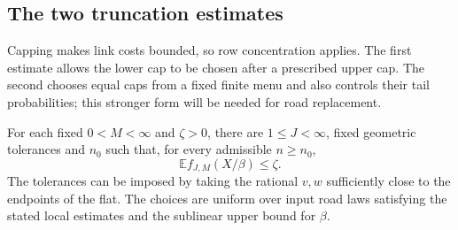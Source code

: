 \subsection{The two truncation estimates}

Capping makes link costs bounded, so row concentration applies.
The first estimate allows the lower cap to be chosen after a
prescribed upper cap. The second chooses equal caps from a fixed
finite menu and also controls their tail probabilities; this stronger
form will be needed for road replacement.

\begin{proposition}
\label{links:asymmetric}
For each fixed \(0<M<\infty\) and \(\zeta>0\), there are
\(1\le J<\infty\), fixed geometric tolerances and \(n_0\) such that,
for every admissible \(n\ge n_0\),
\begin{equation}
 \mathbb E f_{J,M}(X/\beta)\le\zeta.
 \label{links:eq-one}
\end{equation}
The tolerances can be imposed by taking the rational \(v,w\)
sufficiently close to the endpoints of the flat. The choices are
uniform over input road laws satisfying the stated local estimates
and the sublinear upper bound for \(\beta\).
\end{proposition}

